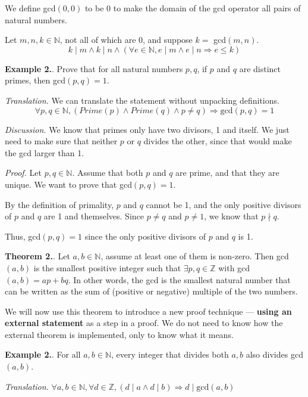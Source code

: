 \documentclass{article}
\newcounter{excount}
\newcounter{thcount}
\newcommand\ex{\stepcounter{excount} \textbf{Example 2.\theexcount}. }
\newcommand\tr{\stepcounter{thcount} \textbf{Theorem 2.\thethcount}. }
\begin{document}
We define gcd$(0, 0)$ to be 0 to make the domain of the gcd operator all 
pairs of natural numbers. 

Let $m, n, k \in \mathbb{N}$, not all of which are 0, and suppose $k = $ gcd$(m,n)$. 
$$k \mid m \land k \mid n \land (\forall e \in \mathbb{N}, e \mid m \land e 
\mid n \Rightarrow e \leq k)$$

\ex Prove that for all natural numbers $p, q$, if $p$ and $q$ are distinct 
primes, then gcd$(p, q) = 1$.

\textit{Translation.} We can translate the statement without unpacking 
definitions.
$$\forall p, q \in \mathbb{N}, (Prime(p) \land Prime(q) \land p \neq q) 
\Rightarrow \text{gcd} (p, q ) = 1$$

\textit{Discussion.} We know that primes only have two divisors, 1 and itself. 
We just need to make sure that neither $p $ or $q$ divides the other, since 
that would make the gcd larger than 1. 

\textit{Proof.} Let $p, q \in \mathbb{N}$. Assume that both $p$ and $q$ are 
prime, and that they are unique. We want to prove that gcd$(p, q) = 1$. 

By the definition of primality, $p$ and $q$ cannot be 1, and the only 
positive divisors of $p$ and $q$ are 1 and themselves. Since $p \neq q$ 
and $p \neq 1$, we know that $p \nmid q$. 

Thus, gcd$(p, q) = 1$ since the only positive divisors of $p$ and $q$ is 1. 

\tr Let $a, b \in \mathbb{N}$, assume at least one of them is non-zero. 
Then gcd$(a, b)$ is the smallest positive integer such that $\exists p, q 
\in \mathbb{Z}$ with gcd$(a, b) = ap + bq$. In other words, the gcd is the 
smallest natural number that can be written as the sum of (positive or negative) 
multiple of the two numbers.

We will now use this theorem to introduce a new proof technique --- \textbf{using 
an external statement} as a step in a proof. We do not need to know how 
the external theorem is implemented, only to know what it means. 

\ex For all $a, b \in \mathbb{N}$, every integer that divides both $a, b$
also divides gcd$(a, b)$. 

\textit{Translation.} $\forall a, b \in \mathbb{N}, \forall d \in \mathbb{Z}, 
(d \mid a \land d \mid b) \Rightarrow d \mid \text{gcd}(a, b)$
\end{document}
